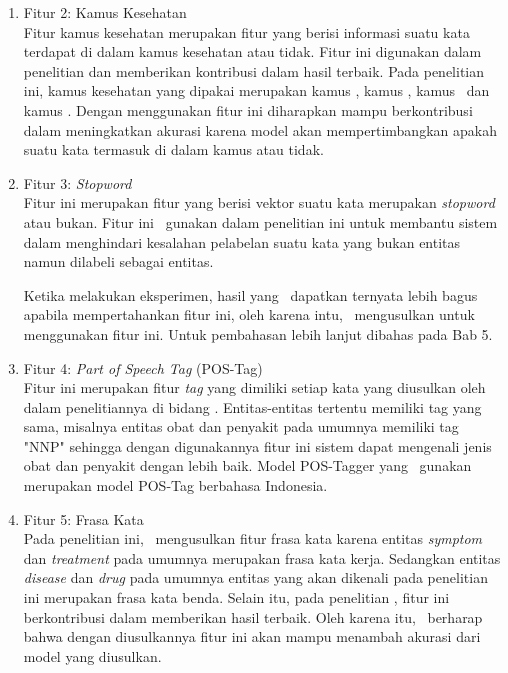 \begin{enumerate}
	\item Fitur 2: Kamus Kesehatan\\
	Fitur kamus kesehatan merupakan fitur yang berisi informasi suatu kata terdapat di dalam kamus kesehatan atau tidak. Fitur ini digunakan dalam penelitian \cite{skripsiKakRadit} dan memberikan kontribusi dalam hasil terbaik. Pada penelitian ini, kamus kesehatan yang dipakai merupakan kamus \disease, kamus \symptom, kamus \drug~dan kamus \treatment. Dengan menggunakan fitur ini diharapkan mampu berkontribusi dalam meningkatkan akurasi karena model akan mempertimbangkan apakah suatu kata termasuk di dalam kamus atau tidak. 
	
	\item Fitur 3: \textit{Stopword}\\
	Fitur ini merupakan fitur yang berisi vektor suatu kata merupakan \textit{stopword} atau bukan. Fitur ini \saya~gunakan dalam penelitian ini untuk membantu sistem dalam menghindari kesalahan pelabelan suatu kata yang bukan entitas namun dilabeli sebagai entitas.
	
	Ketika melakukan eksperimen, hasil yang \saya~dapatkan ternyata lebih bagus apabila mempertahankan fitur ini, oleh karena intu, \saya~mengusulkan untuk menggunakan fitur ini. Untuk pembahasan lebih lanjut dibahas pada Bab 5.
	
	\item Fitur 4: \textit{Part of Speech Tag} (POS-Tag)\\
	Fitur ini merupakan fitur \textit{tag} yang dimiliki setiap kata yang diusulkan oleh \cite{abacha2011medical} dalam penelitiannya di bidang \mer. Entitas-entitas tertentu memiliki tag yang sama, misalnya entitas obat dan penyakit pada umumnya memiliki tag "NNP" sehingga dengan digunakannya fitur ini sistem dapat mengenali jenis obat dan penyakit dengan lebih baik. Model POS-Tagger yang \saya~gunakan merupakan model POS-Tag berbahasa Indonesia.
		
	\item Fitur 5: Frasa Kata\\
	Pada penelitian ini, \saya~mengusulkan fitur frasa kata karena entitas \textit{symptom} dan \textit{treatment}  pada umumnya merupakan frasa kata kerja. Sedangkan entitas \textit{disease} dan \textit{drug} pada umumnya entitas yang akan dikenali pada penelitian ini merupakan frasa kata benda. Selain itu, pada penelitian \cite{skripsiKakRadit}, fitur ini berkontribusi dalam memberikan hasil terbaik. Oleh karena itu, \saya~berharap bahwa dengan diusulkannya fitur ini akan mampu menambah akurasi dari model yang diusulkan.
	

\end{enumerate}
